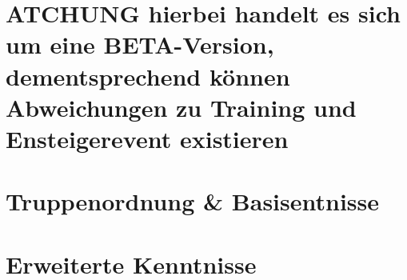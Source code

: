 \documentclass[pdftex,fontsize=12pt,a4paper,numbers=noenddot]{scrreprt}
\begin{document}


\newpage
{} %

\tableofcontents %

\newpage
{} %
\pagestyle{scrheadings}
\renewcommand{\chapterpagestyle}{scrheadings}


\part*{ATCHUNG hierbei handelt es sich um eine BETA-Version, dementsprechend können Abweichungen zu Training und Ensteigerevent existieren}
\part{Truppenordnung \& Basisentnisse}




\part{Erweiterte Kenntnisse}


%
%

%




\cleardoublepage
\appendix
\end{document}
